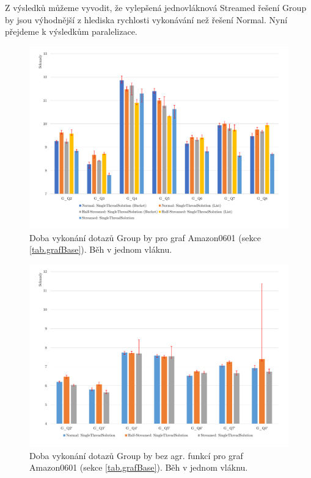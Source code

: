 \bigskip
Z výsledků můžeme vyvodit, že vylepšená jednovláknová Streamed řešení Group by jsou výhodnější z hlediska rychlosti vykonávání než řešení Normal. 
Nyní přejdeme k výsledkům paralelizace.

\begin{figure}[!htp]
\includegraphics[width=\linewidth]{../img/amazonGroupByST.pdf}\centering
\caption{Doba vykonání dotazů Group by pro graf Amazon0601 (sekce \ref{tab.grafBase}). Běh v jednom vláknu.}
\label{figure.amazonGroupByST}
\end{figure}
\begin{figure}[!htp]
\includegraphics[width=\linewidth]{../img/amazonGroupBySTNoAgg.pdf}\centering
\caption{Doba vykonání dotazů Group by bez agr. funkcí pro graf Amazon0601 (sekce \ref{tab.grafBase}). Běh v jednom vláknu.}
\label{figure.amazonGroupBySTNoAgg}
\end{figure}

